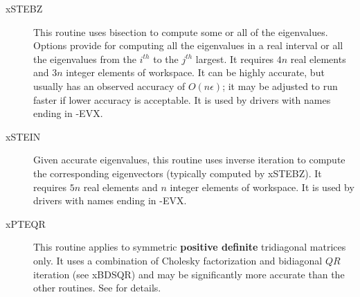 \begin{description}
\item[xSTEBZ]
This routine uses bisection to compute some or all of the eigenvalues.
Options provide for computing all the eigenvalues in a real interval or
all the eigenvalues from the $i^{th}$ to the $j^{th}$ largest.
It requires $4n$ real elements and $3n$ integer elements of workspace.
It can be highly accurate, but usually has an observed accuracy of $O(n\epsilon)$;
it may be adjusted to run faster if lower accuracy is acceptable.
It is used by drivers with names ending in -EVX.

\item[xSTEIN]
Given accurate eigenvalues, this routine uses inverse iteration 
to compute the corresponding eigenvectors (typically computed by xSTEBZ).
It requires $5n$ real elements and $n$ integer elements of workspace.
It is used by drivers with names ending in -EVX.

\item[xPTEQR]
This routine applies to symmetric {\bf positive definite} tridiagonal
matrices only. It uses a combination of Cholesky factorization and bidiagonal $QR$ iteration
(see xBDSQR) and may be significantly more accurate than the other routines.
See \cite{barlowdemmel,demmelkahan,deiftdemmellitomei,fernandoparlett} for details.

\end{description}

         
